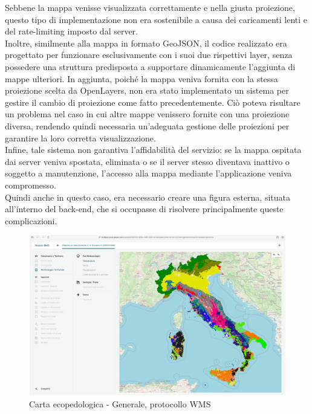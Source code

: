 Sebbene la mappa venisse visualizzata correttamente e nella giusta proiezione, questo tipo di implementazione non era sostenibile a causa dei caricamenti lenti e del rate-limiting imposto dal server. 
\\Inoltre, similmente alla mappa in formato GeoJSON, il codice realizzato era progettato per funzionare esclusivamente con i suoi due rispettivi layer, senza possedere una struttura predisposta a supportare dinamicamente l'aggiunta di mappe ulteriori. In aggiunta, poiché la mappa veniva fornita con la stessa proiezione scelta da OpenLayers, non era stato implementato un sistema per gestire il cambio di proiezione come fatto precedentemente. Ciò poteva risultare un problema nel caso in cui altre mappe venissero fornite con una proiezione diversa, rendendo quindi necessaria un'adeguata gestione delle proiezioni per garantire la loro corretta visualizzazione.
\\Infine, tale sistema non garantiva l'affidabilità del servizio: se la mappa ospitata dai server veniva spostata, eliminata o se il server stesso diventava inattivo o soggetto a manutenzione, l'accesso alla mappa mediante l'applicazione veniva compromesso.
\\Quindi anche in questo caso, era necessario creare una figura esterna, situata all'interno del back-end, che si occupasse di risolvere principalmente queste complicazioni. 
\begin{figure}[htbp]
      \centering
      \includegraphics[width=1\textwidth]{Tesi/images/Capitolo4/italiaWMS.jpg}
      \caption{Carta ecopedologica - Generale, protocollo WMS}
      \label{fig:italiaWMS}
\end{figure}

%